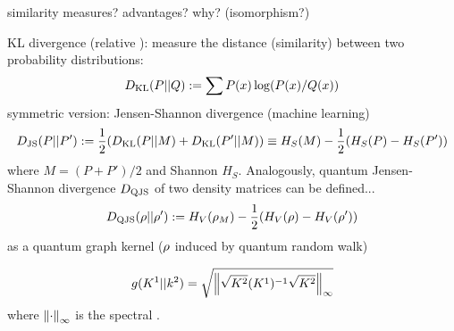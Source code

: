 similarity measures? advantages? why? (isomorphism?)
\begin{definition}[divergence]\label{def:divergence}
	KL divergence (relative ): measure the distance (similarity) between two probability distributions:
	\begin{equation}
		D_\text{KL} (P || Q) := \sum P(x) \log (P(x)/Q(x))
	\end{equation}
	symmetric version: Jensen-Shannon divergence (machine learning)
	\begin{equation}
		D_\text{JS} (P || P') := \frac{1}{2} \qty(D_\text{KL}(P|| M) + D_\text{KL}(P'||M))
		\equiv H_S(M)-\frac{1}{2} (H_S(P) - H_S(P') ) 
	\end{equation}
	where $M=(P+P')/2$ and Shannon  $H_S$.
	Analogously, quantum Jensen-Shannon divergence $D_{\text{QJS}}$ of two density matrices can be defined...
	\begin{equation}
		D_{\text{QJS}}(\rho||\rho'):= 
		H_V(\rho_M) - \frac{1}{2} (H_V(\rho) - H_V(\rho') ) 
	\end{equation}
	as a quantum graph kernel ($\rho$ induced by quantum random walk)
\end{definition}
\begin{definition}\label{def:geometric_difference}
	\begin{equation}
		g(K^1|| k^2) = \sqrt{\norm{\sqrt{K^2} (K^1)^{-1}\sqrt{K^2}}_{\infty}}
	\end{equation}
	where $\norm{\cdot}_{\infty}$ is the spectral .
\end{definition}


